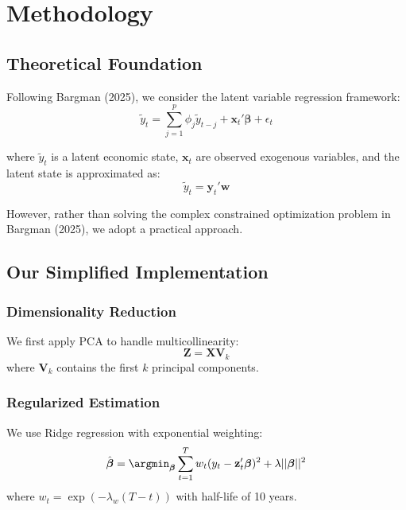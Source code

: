 \documentclass[12pt]{article}
\begin{document}
\section{Methodology}

\subsection{Theoretical Foundation}

Following Bargman (2025), we consider the latent variable regression framework:
\begin{equation}
\tilde{y}_t = \sum_{j=1}^p \phi_j \tilde{y}_{t-j} + \mathbf{x}_t' \boldsymbol{\beta} + \epsilon_t
\end{equation}

where $\tilde{y}_t$ is a latent economic state, $\mathbf{x}_t$ are observed exogenous variables, and the latent state is approximated as:
\begin{equation}
\tilde{y}_t = \mathbf{y}_t' \mathbf{w}
\end{equation}

However, rather than solving the complex constrained optimization problem in Bargman (2025), we adopt a practical approach.

\subsection{Our Simplified Implementation}

\subsubsection{Dimensionality Reduction}
We first apply PCA to handle multicollinearity:
\begin{equation}
\mathbf{Z} = \mathbf{X} \mathbf{V}_k
\end{equation}
where $\mathbf{V}_k$ contains the first $k$ principal components.

\subsubsection{Regularized Estimation}
We use Ridge regression with exponential weighting:
\begin{equation}
\hat{\boldsymbol{\beta}} = \argmin_{\boldsymbol{\beta}} \sum_{t=1}^T w_t (y_t - \mathbf{z}_t' \boldsymbol{\beta})^2 + \lambda ||\boldsymbol{\beta}||^2
\end{equation}
where $w_t = \exp(-\lambda_w (T-t))$ with half-life of 10 years.
\end{document}

